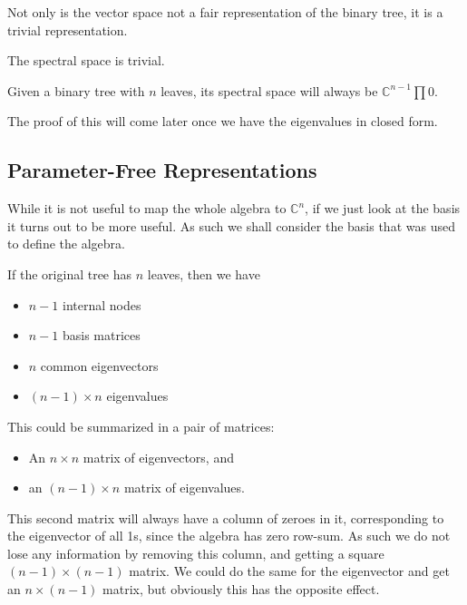 \documentclass{article}
\begin{document}
Not only is the vector space not a fair representation of the binary tree, it
is a trivial representation.

\begin{theorem} The spectral space is trivial.

	Given a binary tree with $n$ leaves, its spectral space will always be
	$\mathds{C}^{n-1} \prod {0}$.
\end{theorem}

The proof of this will come later once we have the eigenvalues in closed form.

\subsection{Parameter-Free Representations}

While it is not useful to map the whole algebra to $\mathds{C}^n$, if we just
look at the basis it turns out to be more useful.
As such we shall consider the basis that was used to define the algebra.

If the original tree has $n$ leaves, then we have
\begin{itemize}
	\item $n-1$ internal nodes
	\item $n-1$ basis matrices
	\item $n$ common eigenvectors
	\item $(n-1) \times n$ eigenvalues
\end{itemize}

This could be summarized in a pair of matrices:
\begin{itemize}
	\item An $n \times n$ matrix of eigenvectors, and
	\item an $(n-1) \times n$ matrix of eigenvalues.
\end{itemize}

This second matrix will always have a column of zeroes in it, corresponding to
the eigenvector of all 1s, since the algebra has zero row-sum.
As such we do not lose any information by removing this column, and getting a
square $(n-1) \times (n-1)$ matrix.
We could do the same for the eigenvector and get an $n \times (n-1)$ matrix,
but obviously this has the opposite effect.
\end{document}
